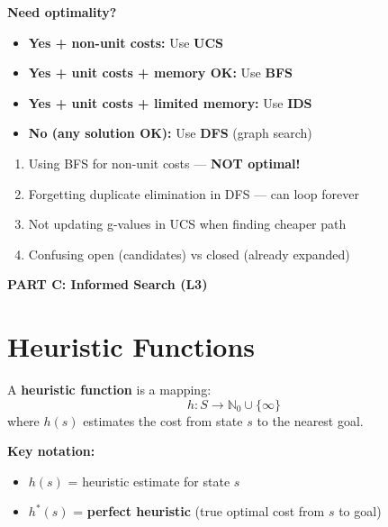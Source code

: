 \documentclass[11pt,a4paper]{article}
\begin{document}
\begin{definitionbox}
\textbf{Need optimality?}
\begin{itemize}[leftmargin=*,nosep]
\item \textbf{Yes + non-unit costs:} Use \textbf{UCS}
\item \textbf{Yes + unit costs + memory OK:} Use \textbf{BFS}
\item \textbf{Yes + unit costs + limited memory:} Use \textbf{IDS}
\item \textbf{No (any solution OK):} Use \textbf{DFS} (graph search)
\end{itemize}
\end{definitionbox}

\begin{warningbox}
\begin{enumerate}[leftmargin=*,nosep]
\item Using BFS for non-unit costs --- \textbf{NOT optimal!}
\item Forgetting duplicate elimination in DFS --- can loop forever
\item Not updating g-values in UCS when finding cheaper path
\item Confusing open (candidates) vs closed (already expanded)
\end{enumerate}
\end{warningbox}

\newpage
\begin{center}
\textbf{\LARGE PART C: Informed Search (L3)}
\end{center}
\vspace{1em}

\renewcommand{\thesection}{C.\arabic{section}}

\section{Heuristic Functions}

\begin{definitionbox}
A \textbf{heuristic function} is a mapping:
\[h: S \to \mathbb{N}_0 \cup \{\infty\}\]
where $h(s)$ estimates the cost from state $s$ to the nearest goal.

\textbf{Key notation:}
\begin{itemize}[leftmargin=*,nosep]
\item $h(s)$ = heuristic estimate for state $s$
\item $h^*(s)$ = \textbf{perfect heuristic} (true optimal cost from $s$ to goal)
\end{itemize}
\end{definitionbox}
\end{document}
